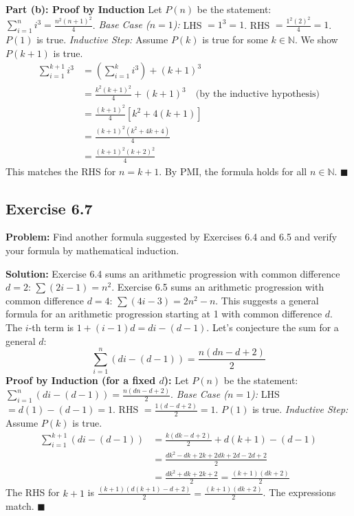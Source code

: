 \documentclass[11pt, a4paper]{article}
\theoremstyle{definition}
\theoremstyle{remark}
\newcommand{\N}{\mathbb{N}}
\begin{document}
\textbf{Part (b): Proof by Induction}
Let $P(n)$ be the statement: $\sum_{i=1}^n i^3 = \frac{n^2(n+1)^2}{4}$.
\textit{Base Case ($n=1$):} LHS $= 1^3 = 1$. RHS $= \frac{1^2(2)^2}{4} = 1$. $P(1)$ is true.
\textit{Inductive Step:} Assume $P(k)$ is true for some $k \in \N$. We show $P(k+1)$ is true.
\[
\begin{aligned}
\sum_{i=1}^{k+1} i^3 &= \left( \sum_{i=1}^k i^3 \right) + (k+1)^3 \\
&= \frac{k^2(k+1)^2}{4} + (k+1)^3 \quad \text{(by the inductive hypothesis)} \\
&= \frac{(k+1)^2}{4} \left[ k^2 + 4(k+1) \right] \\
&= \frac{(k+1)^2 (k^2 + 4k + 4)}{4} \\
&= \frac{(k+1)^2 (k+2)^2}{4}
\end{aligned}
\]
This matches the RHS for $n=k+1$. By PMI, the formula holds for all $n \in \N$. \hfill $\blacksquare$

\subsection*{Exercise 6.7}
\textbf{Problem:} Find another formula suggested by Exercises 6.4 and 6.5 and verify your formula by mathematical induction.

\textbf{Solution:}
Exercise 6.4 sums an arithmetic progression with common difference $d=2$: $\sum (2i-1) = n^2$.
Exercise 6.5 sums an arithmetic progression with common difference $d=4$: $\sum (4i-3) = 2n^2 - n$.
This suggests a general formula for an arithmetic progression starting at 1 with common difference $d$. The $i$-th term is $1 + (i-1)d = di - (d-1)$. Let's conjecture the sum for a general $d$:
\[
\sum_{i=1}^n (di - (d-1)) = \frac{n(dn - d + 2)}{2}
\]
\textbf{Proof by Induction (for a fixed $d$):}
Let $P(n)$ be the statement: $\sum_{i=1}^n (di - (d-1)) = \frac{n(dn - d + 2)}{2}$.
\textit{Base Case ($n=1$):} LHS $= d(1) - (d-1) = 1$. RHS $= \frac{1(d - d + 2)}{2} = 1$. $P(1)$ is true.
\textit{Inductive Step:} Assume $P(k)$ is true.
\[
\begin{aligned}
\sum_{i=1}^{k+1} (di - (d-1)) &= \frac{k(dk - d + 2)}{2} + d(k+1) - (d-1) \\
&= \frac{dk^2 - dk + 2k + 2dk + 2d - 2d + 2}{2} \\
&= \frac{dk^2 + dk + 2k + 2}{2} = \frac{(k+1)(dk + 2)}{2}
\end{aligned}
\]
The RHS for $k+1$ is $\frac{(k+1)(d(k+1) - d + 2)}{2} = \frac{(k+1)(dk + 2)}{2}$. The expressions match. \hfill $\blacksquare$
\end{document}

